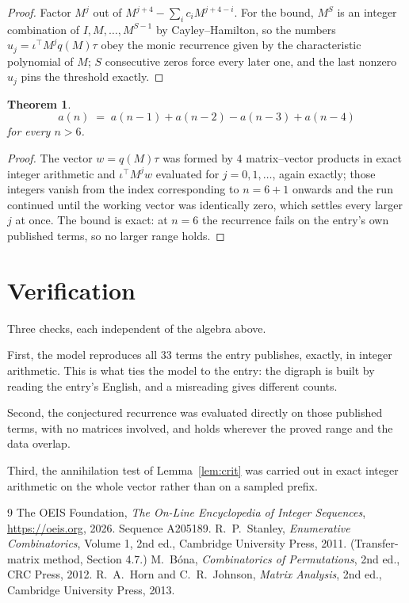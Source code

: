 \documentclass[11pt,a4paper]{article}
\theoremstyle{plain}
\newtheorem{theorem}{Theorem}
\theoremstyle{definition}
\begin{document}
\begin{proof}
Factor $M^{j}$ out of $M^{j+4}-\sum_ic_iM^{j+4-i}$. For the bound, $M^{S}$
is an integer combination of $I,M,\dots,M^{S-1}$ by Cayley--Hamilton, so the numbers
$u_j=\iota^{\!\top}M^{j}q(M)\tau$ obey the monic recurrence given by the characteristic
polynomial of $M$; $S$ consecutive zeros force every later one, and the last nonzero $u_j$
pins the threshold exactly.
\end{proof}

\begin{theorem}
\[
a(n)\;=\;a(n-1) + a(n-2) - a(n-3) + a(n-4)
\]
for every $n>6$.
\end{theorem}

\begin{proof}
The vector $w=q(M)\tau$ was formed by $4$ matrix--vector products in exact integer
arithmetic and $\iota^{\!\top}M^{j}w$ evaluated for $j=0,1,\dots$, again exactly; those
integers vanish from the index corresponding to $n=6+1$ onwards and the run continued
until the working vector was identically zero, which settles every larger $j$ at once. The bound is exact: at $n=6$ the recurrence fails on the entry's own published terms, so no larger range holds.
\end{proof}

\section{Verification}

Three checks, each independent of the algebra above.

First, the model reproduces all $33$ terms the entry publishes, exactly, in integer
arithmetic. This is what ties the model to the entry: the digraph is built by reading the
entry's English, and a misreading gives different counts.

Second, the conjectured recurrence was evaluated directly on those published terms, with no
matrices involved, and holds wherever the proved range and the data overlap.

Third, the annihilation test of Lemma~\ref{lem:crit} was carried out in exact integer
arithmetic on the whole vector rather than on a sampled prefix.

\begin{thebibliography}{9}
 The OEIS Foundation, \emph{The On-Line Encyclopedia of Integer
Sequences}, \url{https://oeis.org}, 2026. Sequence A205189.
 R.~P.~Stanley, \emph{Enumerative Combinatorics}, Volume 1, 2nd ed.,
Cambridge University Press, 2011. (Transfer-matrix method, Section 4.7.)
 M.~B\'ona, \emph{Combinatorics of Permutations}, 2nd ed., CRC
Press, 2012.
 R.~A.~Horn and C.~R.~Johnson, \emph{Matrix Analysis}, 2nd ed., Cambridge
University Press, 2013.
\end{thebibliography}
\end{document}
